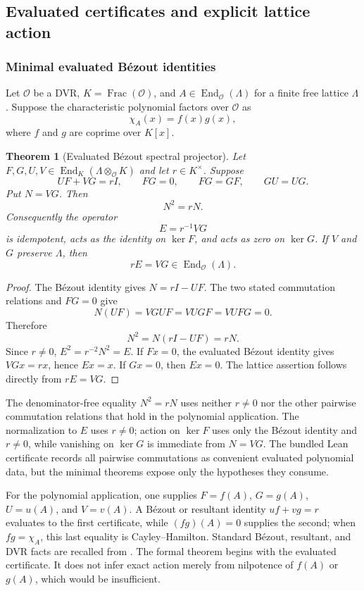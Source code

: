 \documentclass[11pt,a4paper]{article}
\newtheorem{theorem}{Theorem}[section]
\theoremstyle{definition}
\theoremstyle{remark}
\newcommand{\OO}{\mathcal O}
\newcommand{\End}{\operatorname{End}}
\newcommand{\Frac}{\operatorname{Frac}}
\providecommand{\End}{\operatorname{End}}
\providecommand{\OO}{\mathcal O}
\providecommand{\Frac}{\operatorname{Frac}}
\theoremstyle{definition}\newtheorem{construction}[theorem]{Construction}\newtheorem{certificate}[theorem]{Numerical Certificate}
\theoremstyle{remark}\newtheorem{boundary}[theorem]{Boundary}
\begin{document}
\subsection{Evaluated certificates and explicit lattice action}

\subsubsection{Minimal evaluated B\'ezout identities}

Let $\OO$ be a DVR, $K=\Frac(\OO)$, and $A\in\End_\OO(\Lambda)$ for a finite free lattice $\Lambda$. Suppose the characteristic polynomial factors over $\OO$ as
\[
\chi_A(x)=f(x)g(x),
\]
where $f$ and $g$ are coprime over $K[x]$.

\begin{theorem}[Evaluated B\'ezout spectral projector]\label{thm:bezout-projector}
Let $F,G,U,V\in\End_K(\Lambda\otimes_\OO K)$ and let $r\in K^\times$.
Suppose
\[
UF+VG=rI,
\qquad FG=0,
\qquad FG=GF,
\qquad GU=UG.
\]
Put $N=VG$. Then
\[
\boxed{N^2=rN.}
\]
Consequently the operator
\[
\boxed{
E=r^{-1}VG
}
\]
is idempotent, acts as the identity on $\ker F$, and acts as zero on
$\ker G$. If $V$ and $G$ preserve $\Lambda$, then
\[
rE=VG\in\End_\OO(\Lambda).
\]
\end{theorem}

\begin{proof}
The B\'ezout identity gives $N=rI-UF$. The two stated commutation relations
and $FG=0$ give
\[
N(UF)=VGUF=VUGF=VUFG=0.
\]
Therefore
\[
N^2=N(rI-UF)=rN.
\]
Since $r\ne0$, $E^2=r^{-2}N^2=E$. If $Fx=0$, the evaluated B\'ezout
identity gives $VGx=rx$, hence $Ex=x$. If $Gx=0$, then $Ex=0$.
The lattice assertion follows directly from $rE=VG$.
\end{proof}

The denominator-free equality $N^2=rN$ uses neither $r\ne0$ nor the other
pairwise commutation relations that hold in the polynomial application. The
normalization to $E$ uses $r\ne0$; action on $\ker F$ uses only the B\'ezout
identity and $r\ne0$, while vanishing on $\ker G$ is immediate from $N=VG$.
The bundled Lean certificate records all pairwise commutations as convenient
evaluated polynomial data, but the minimal theorems expose only the hypotheses
they consume.

For the polynomial application, one supplies $F=f(A)$, $G=g(A)$,
$U=u(A)$, and $V=v(A)$. A B\'ezout or resultant identity
$uf+vg=r$ evaluates to the first certificate, while
$(fg)(A)=0$ supplies the second; when $fg=\chi_A$, this last equality is
Cayley--Hamilton. Standard B\'ezout, resultant, and DVR facts are recalled
from \cite{Lang2002,Serre1979}. The formal theorem begins with the evaluated
certificate. It does not infer exact action merely from nilpotence of
$f(A)$ or $g(A)$, which would be insufficient.
\end{document}
